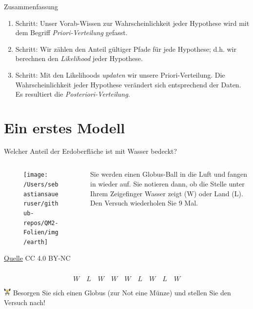 \documentclass[
  ngerman,
  ignorenonframetext,
]{beamer}
\begin{document}
\begin{frame}{Zusammenfassung}
\protect\hypertarget{zusammenfassung}{}
\begin{enumerate}
\item
  Schritt: Unser Vorab-Wissen zur Wahrscheinlichkeit jeder Hypothese
  wird mit dem Begriff \emph{Priori-Verteilung} gefasst.
\item
  Schritt: Wir zählen den Anteil gültiger Pfade für jede Hypothese; d.h.
  wir berechnen den \emph{Likelihood} jeder Hypothese.
\item
  Schritt: Mit den Likelihoods \emph{updaten} wir unsere
  Priori-Verteilung. Die Wahrscheinlichkeit jeder Hypothese verändert
  sich entsprechend der Daten. Es resultiert die
  \emph{Posteriori-Verteilung}.
\end{enumerate}
\end{frame}

\hypertarget{ein-erstes-modell}{%
\section{Ein erstes Modell}\label{ein-erstes-modell}}

\begin{frame}{Welcher Anteil der Erdoberfläche ist mit Wasser bedeckt?}
\protect\hypertarget{welcher-anteil-der-erdoberfluxe4che-ist-mit-wasser-bedeckt}{}
\begin{columns}[T]
\begin{column}{0.3\textwidth}
\begin{figure}[H]
\texttt{[image: /Users/sebastiansaueruser/github-repos/QM2-Folien/img/earth]} \end{figure}
\tiny

\href{https://pngimg.com/image/25340}{Quelle} CC 4.0 BY-NC \normalsize
\end{column}

\begin{column}{0.7\textwidth}
Sie werden einen Globus-Ball in die Luft und fangen in wieder auf. Sie
notieren dann, ob die Stelle unter Ihrem Zeigefinger Wasser zeigt (W)
oder Land (L). Den Versuch wiederholen Sie 9 Mal.
\end{column}
\end{columns}

\[W \quad L \quad W \quad W \quad W \quad L \quad W \quad L \quad W\]

\includegraphics[width=1em]{../img/weight.pdf} Besorgen Sie sich einen
Globus (zur Not eine Münze) und stellen Sie den Versuch nach!
\end{frame}
\end{document}
